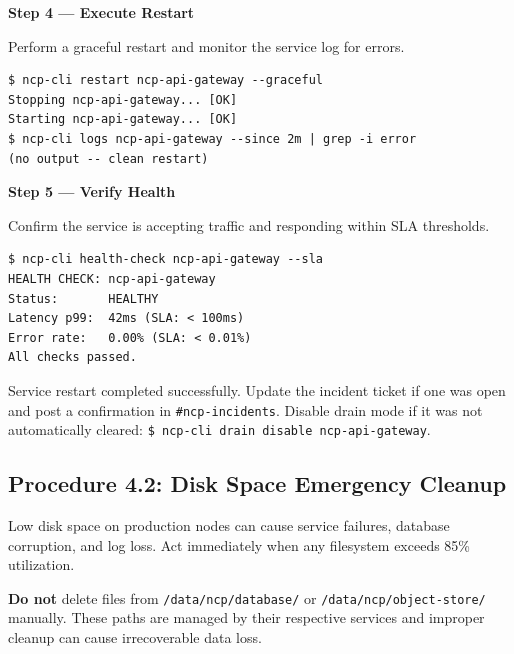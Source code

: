 \begin{stepbox}
\textbf{Step 4 --- Execute Restart}\smallskip

Perform a graceful restart and monitor the service log for errors.
\end{stepbox}

\begin{cmdbox}
\begin{Verbatim}[fontsize=\footnotesize]
$ ncp-cli restart ncp-api-gateway --graceful
Stopping ncp-api-gateway... [OK]
Starting ncp-api-gateway... [OK]
$ ncp-cli logs ncp-api-gateway --since 2m | grep -i error
(no output -- clean restart)
\end{Verbatim}
\end{cmdbox}

\begin{stepbox}
\textbf{Step 5 --- Verify Health}\smallskip

Confirm the service is accepting traffic and responding within SLA thresholds.
\end{stepbox}

\begin{cmdbox}
\begin{Verbatim}[fontsize=\footnotesize]
$ ncp-cli health-check ncp-api-gateway --sla
HEALTH CHECK: ncp-api-gateway
Status:       HEALTHY
Latency p99:  42ms (SLA: < 100ms)
Error rate:   0.00% (SLA: < 0.01%)
All checks passed.
\end{Verbatim}
\end{cmdbox}

\begin{successbox}
Service restart completed successfully. Update the incident ticket if one was open and post a confirmation in \texttt{\#ncp-incidents}. Disable drain mode if it was not automatically cleared: \texttt{\$ ncp-cli drain disable ncp-api-gateway}.
\end{successbox}

\subsection{Procedure 4.2: Disk Space Emergency Cleanup}

Low disk space on production nodes can cause service failures, database corruption, and log loss. Act immediately when any filesystem exceeds 85\% utilization.

\begin{warningbox}
\textbf{Do not} delete files from \texttt{/data/ncp/database/} or \texttt{/data/ncp/object-store/} manually. These paths are managed by their respective services and improper cleanup can cause irrecoverable data loss.
\end{warningbox}

